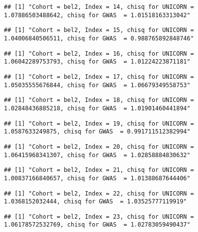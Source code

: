 \documentclass[]{article}
\begin{document}
\begin{verbatim}
## [1] "Cohort = bel2, Index = 14, chisq for UNICORN = 1.07886503488642, chisq for GWAS  = 1.01518163313042"
\end{verbatim}

\begin{verbatim}
## [1] "Cohort = bel2, Index = 15, chisq for UNICORN = 1.04006840506511, chisq for GWAS  = 0.988765892848746"
\end{verbatim}

\begin{verbatim}
## [1] "Cohort = bel2, Index = 16, chisq for UNICORN = 1.06042289753793, chisq for GWAS  = 1.01224223871181"
\end{verbatim}

\begin{verbatim}
## [1] "Cohort = bel2, Index = 17, chisq for UNICORN = 1.05035555676844, chisq for GWAS  = 1.06679349558753"
\end{verbatim}

\begin{verbatim}
## [1] "Cohort = bel2, Index = 18, chisq for UNICORN = 1.02848436885218, chisq for GWAS  = 1.01901460441894"
\end{verbatim}

\begin{verbatim}
## [1] "Cohort = bel2, Index = 19, chisq for UNICORN = 1.0587633249875, chisq for GWAS  = 0.991711512382994"
\end{verbatim}

\begin{verbatim}
## [1] "Cohort = bel2, Index = 20, chisq for UNICORN = 1.06415968341307, chisq for GWAS  = 1.02858884830632"
\end{verbatim}

\begin{verbatim}
## [1] "Cohort = bel2, Index = 21, chisq for UNICORN = 1.00837166840657, chisq for GWAS  = 1.01388687644406"
\end{verbatim}

\begin{verbatim}
## [1] "Cohort = bel2, Index = 22, chisq for UNICORN = 1.0368152032444, chisq for GWAS  = 1.03525777119919"
\end{verbatim}

\begin{verbatim}
## [1] "Cohort = bel2, Index = 23, chisq for UNICORN = 1.06178572532769, chisq for GWAS  = 1.02783059490437"
\end{verbatim}
\end{document}
